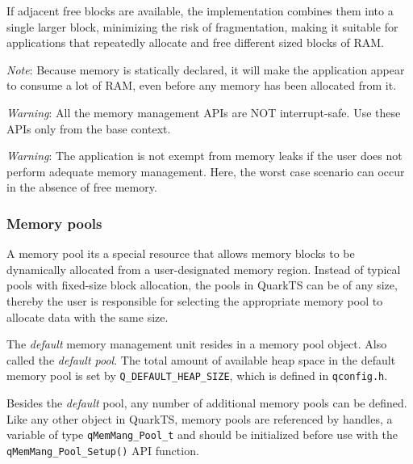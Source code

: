 If adjacent free blocks are available, the implementation combines them into a single larger block, minimizing the risk of fragmentation, making it suitable for applications that repeatedly allocate and free different sized blocks of RAM.



\begin{tcolorbox}
\ArrowBoldDownRight \textit{Note}: Because memory is statically declared, it will make the application appear to consume a lot of RAM, even before any memory has been allocated from it.
\end{tcolorbox}

\begin{tcolorbox}
\AsteriskBold \textit{Warning}: All the memory management APIs are NOT interrupt-safe. Use these APIs only from the base context.
\end{tcolorbox}

\begin{tcolorbox}
\AsteriskBold \textit{Warning}: The application is not exempt from memory leaks if the user does not perform adequate memory management. Here, the worst case scenario can occur in the absence of free memory. 
\end{tcolorbox}

\subsubsection{Memory pools}

A memory pool its a special resource that allows memory blocks to be dynamically allocated from a user-designated memory region. Instead of typical pools with fixed-size block allocation, the pools in QuarkTS can be of any size, thereby the user is responsible for selecting the appropriate memory pool to allocate data with the same size. 

The \textit{default} memory management unit resides in a memory pool object. Also called the \textit{default pool}. The total amount of available heap space in the default memory pool is set by \lstinline{Q_DEFAULT_HEAP_SIZE}, which is defined in \lstinline{qconfig.h}.

Besides the \textit{default} pool, any number of additional memory pools can be defined. Like any other object in QuarkTS, memory pools are referenced by handles, a variable of type \lstinline{qMemMang_Pool_t}  and should be initialized before use with the \lstinline{qMemMang_Pool_Setup()}  API function.
\medskip


